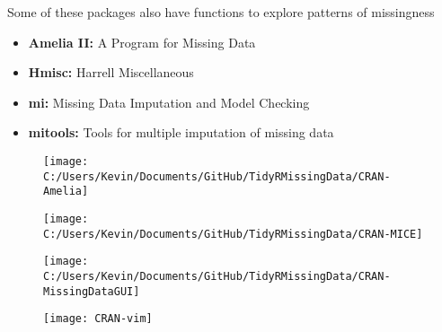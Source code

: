 \documentclass[MASTER.tex]{subfiles}
\begin{document}
 

\begin{frame}[fragile]
	\Large
	Some of these packages also have functions to explore patterns of missingness %

	\begin{itemize}	
	\item \textbf{Amelia II:} A Program for Missing Data
	\item \textbf{Hmisc:} Harrell Miscellaneous
	\item \textbf{mi:} Missing Data Imputation and Model Checking
	\item \textbf{mitools:} Tools for multiple imputation of missing data
	\end{itemize}
\end{frame}	
\begin{frame}
	\begin{figure}
\centering
\texttt{[image: C:/Users/Kevin/Documents/GitHub/TidyRMissingData/CRAN-Amelia]}
\end{figure}
\end{frame}
\begin{frame}
	\begin{figure}
\centering
\texttt{[image: C:/Users/Kevin/Documents/GitHub/TidyRMissingData/CRAN-MICE]}
\end{figure}
\end{frame}
\begin{frame}
	\begin{figure}
\centering
\texttt{[image: C:/Users/Kevin/Documents/GitHub/TidyRMissingData/CRAN-MissingDataGUI]}
\end{figure}
\end{frame}
\begin{frame}
\begin{figure}
\centering
\texttt{[image: CRAN-vim]}
\end{figure}
\end{frame}
\end{document}
